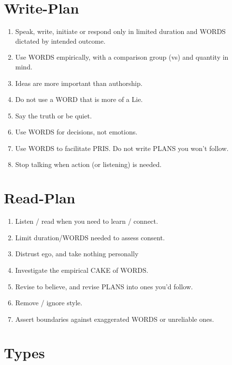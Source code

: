 \documentclass[
]{book}
\providecommand{\tightlist}{%
  \setlength{\itemsep}{0pt}\setlength{\parskip}{0pt}}
\begin{document}
\hypertarget{write-plan}{%
\section{Write-Plan}\label{write-plan}}

\begin{enumerate}
\def\labelenumi{\arabic{enumi}.}
\setcounter{enumi}{35}
\tightlist
\item
  Speak, write, initiate or respond only in limited duration and WORDS
  dictated by intended outcome.
\item
  Use WORDS empirically, with a comparison group (vs) and quantity in
  mind.
\item
  Ideas are more important than authorship.
\item
  Do not use a WORD that is more of a Lie.
\item
  Say the truth or be quiet.
\item
  Use WORDS for decisions, not emotions.
\item
  Use WORDS to facilitate PRIS. Do not write PLANS you won't follow.
\item
  Stop talking when action (or listening) is needed.
\end{enumerate}

\hypertarget{read-plan}{%
\section{Read-Plan}\label{read-plan}}

\begin{enumerate}
\def\labelenumi{\arabic{enumi}.}
\setcounter{enumi}{45}
\tightlist
\item
  Listen / read when you need to learn / connect.
\item
  Limit duration/WORDS needed to assess consent.
\item
  Distrust ego, and take nothing personally
\item
  Investigate the empirical CAKE of WORDS.
\item
  Revise to believe, and revise PLANS into ones you'd follow.
\item
  Remove / ignore style.
\item
  Assert boundaries against exaggerated WORDS or unreliable ones.
\end{enumerate}

\hypertarget{types}{%
\section{Types}\label{types}}
\end{document}
